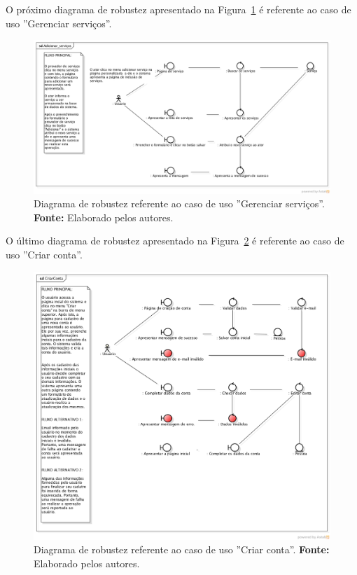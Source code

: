 O próximo diagrama de robustez apresentado na Figura~\ref{fig:ap1:diagrama_robustez_gerenciar_servicos} é referente ao caso de uso ''Gerenciar serviços''.

\captionsetup[figure]{list=no}
\begin{figure}[h!]
	\centerline{\includegraphics[scale=0.38]{./imagens/apendices/diagrama-robustez-adicionar-servicos.png}}
	\caption[Diagrama de robustez referente ao caso de uso ''Gerenciar serviços''.]
	{Diagrama de robustez referente ao caso de uso ''Gerenciar serviços''. \textbf{Fonte:} Elaborado pelos autores.}
	\label{fig:ap1:diagrama_robustez_gerenciar_servicos}
\end{figure}

O último diagrama de robustez apresentado na Figura~\ref{fig:ap1:diagrama_robustez_criar_conta} é referente ao caso de uso ''Criar conta''.

\newpage
\captionsetup[figure]{list=no}
\begin{figure}[h!]
	\centerline{\includegraphics[scale=0.4]{./imagens/apendices/diagrama-robustez-criar-conta.png}}
	\caption[Diagrama de robustez referente ao caso de uso ''Criar conta''.]
	{Diagrama de robustez referente ao caso de uso ''Criar conta''. \textbf{Fonte:} Elaborado pelos autores.}
	\label{fig:ap1:diagrama_robustez_criar_conta}
\end{figure}

